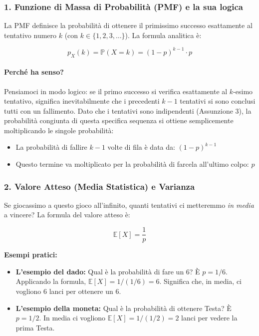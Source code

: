 \subsubsection{1. Funzione di Massa di Probabilità (PMF) e la sua logica}

La PMF definisce la probabilità di ottenere il primissimo successo esattamente al tentativo numero $k$ (con $k \in \{1, 2, 3, \dots\}$). La formula analitica è:

\begin{equation}
\boxed{p_X(k) = \mathbb{P}(X = k) = (1 - p)^{k-1} \cdot p}
\end{equation}

\paragraph{Perché ha senso?}
Pensiamoci in modo logico: se il primo successo si verifica esattamente al $k$-esimo tentativo, significa inevitabilmente che i precedenti $k - 1$ tentativi si sono conclusi tutti con un fallimento.
Dato che i tentativi sono indipendenti (Assunzione 3), la probabilità congiunta di questa specifica sequenza si ottiene semplicemente moltiplicando le singole probabilità:
\begin{itemize}
    \item La probabilità di fallire $k - 1$ volte di fila è data da: $(1 - p)^{k-1}$
    \item Questo termine va moltiplicato per la probabilità di farcela all'ultimo colpo: $p$
\end{itemize}

\subsubsection{2. Valore Atteso (Media Statistica) e Varianza}

Se giocassimo a questo gioco all'infinito, quanti tentativi ci metteremmo \textit{in media} a vincere? La formula del valore atteso è:

\begin{equation}
\mathbb{E}[X] = \frac{1}{p}
\end{equation}

\textbf{Esempi pratici:}
\begin{itemize}
    \item \textbf{L'esempio del dado:} Qual è la probabilità di fare un 6? È $p = 1/6$. Applicando la formula, $\mathbb{E}[X] = 1 / (1/6) = 6$. Significa che, in media, ci vogliono 6 lanci per ottenere un 6.
    \item \textbf{L'esempio della moneta:} Qual è la probabilità di ottenere Testa? È $p = 1/2$. In media ci vogliono $\mathbb{E}[X] = 1 / (1/2) = 2$ lanci per vedere la prima Testa.
\end{itemize}

